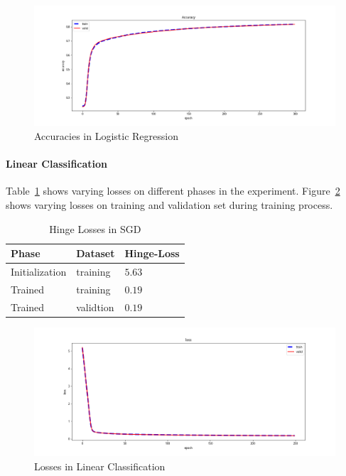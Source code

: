 \documentclass[journal, a4paper]{IEEEtran}
\begin{document}
    \begin{figure}[!hbt]
        \begin{center}
        \caption{Accuracies in Logistic Regression}
        \label{fig:logistic-acc}
        \includegraphics[width=\columnwidth]{../images/logistics-regression-accuracy.png}
        \end{center}
    \end{figure}

\paragraph{Linear Classification}
    Table~\ref{tab:linear-losses} shows varying losses on different phases in the experiment. Figure~\ref{fig:linear-losses} shows varying losses on training and validation set during training process.
    
    \begin{table}[!hbt]
        \begin{center}
        \caption{Hinge Losses in SGD}
        \label{tab:linear-losses}
        \begin{tabular}{l|l|l}
            \hline
            Phase & Dataset & Hinge-Loss \\
            \hline
            Initialization & training & $5.63$ \\
            Trained & training & $0.19$ \\
            Trained & validtion & $0.19$ \\
            \hline
        \end{tabular}
        \end{center}
    \end{table}
     
    \begin{figure}[!hbt]
        \begin{center}
        \caption{Losses in Linear Classification}
        \label{fig:linear-losses}
        \includegraphics[width=\columnwidth]{../images/linear-classification-losses.png}
        \end{center}
    \end{figure}
    
\end{document}
